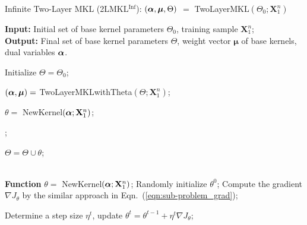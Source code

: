 \begin{algorithm}[ht]
\caption{Infinite Two-Layer MKL (2LMKL$^{\mathrm{Inf}}$): $({\boldsymbol{\alpha}}, \boldsymbol{\mu}, \Theta)$ $=$ TwoLayerMKL$(
\Theta_0;\mathbf X^n_1 )$}

\textbf{Input:} Initial set of base kernel parameters $\Theta_0$, training sample $\mathbf X^n_1$; \\
\textbf{Output:} Final set of base kernel parameters $\Theta$, weight vector  $\bm\mu$ of base kernels, dual variables ${\boldsymbol{\alpha}}$.

\begin{algorithmic}
[1] \STATE Initialize $\Theta = \Theta_0$;


\STATE $({\boldsymbol{\alpha}}, \boldsymbol{\mu}) = $ TwoLayerMKLwithTheta$(\Theta; \mathbf X^n_1)$;

\STATE $\theta = $ NewKernel$({\boldsymbol{\alpha}}; \mathbf X^n_1)$;


;

\ENDIF

\STATE $\Theta = \Theta \cup \theta$;

\ENDWHILE
\\
\STATE
\STATE \textbf{Function} $\theta = $ NewKernel$({\boldsymbol{\alpha}}; \mathbf X^n_1)$;
\STATE Randomly initialize $\theta^0$;
\STATE  Compute the gradient $\nabla J_\theta$ by the similar approach in Eqn.~(\ref{eqn:sub-problem_grad});

\STATE Determine a step size $\eta^{t}$, update $\theta^t = \theta^{t - 1} +
\eta^t\nabla J_\theta$;
\ENDWHILE

\end{algorithmic}
\label{alg:deep-mkl}
\end{algorithm}

